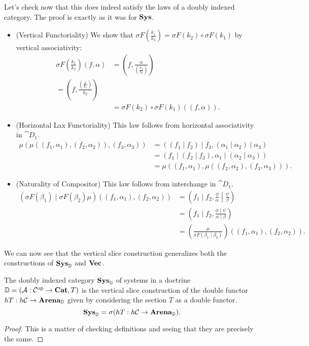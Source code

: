 \documentclass[DynamicalBook]{subfiles}
\begin{document}
Let's check now that this does indeed satisfy the laws of a doubly indexed
category. The proof is exactly as it was for $\textbf{Sys}$. 
\begin{itemize}
  \item (Vertical Functoriality) We show that $\sigma F\left(
      \frac{k_1}{k_2} \right) =
    \sigma F(k_2) \circ \sigma F (k_1)$ by
    vertical associativity:
\begin{align*}
  \sigma F\left(\frac{k_1}{k_2}\right)(f, \alpha) &= \left(f,  \frac{\alpha}{\left( \frac{k_1}{k_2} \right)} \right) \\
= \left(f, \frac{\left( \frac{\alpha}{k_1} \right)}{k_2}   \right)\\
&= \sigma F(k_2) \circ \sigma F (k_1)((f, \alpha)).
\end{align*}

\item (Horizontal Lax Functoriality) This law follows from horizontal
  associativity in $\cat{D}_1$.
\begin{align*}
  \mu(\mu((f_1, \alpha_1), (f_2, \alpha_2)), (f_3, \alpha_3)) &= ((f_1 \mid f_2) \mid f_3, (\alpha_1 \mid \alpha_2) \mid \alpha_3) \\
&= (f_1 \mid (f_2 \mid f_3), \alpha_1 \mid (\alpha_2 \mid \alpha_3)) \\
&= \mu((f_1, \alpha_1), \mu((f_2, \alpha_2), (f_3, \alpha_3))).
\end{align*}
\item (Naturality of Compositor) This law follows from interchange in
  $\cat{D}_1$.
\begin{align*}
  \left( \sigma F(\beta_1) \mid \sigma F(\beta_2){\mu} \right)((f_1, \alpha_1), (f_2, \alpha_2)) &= \left(f_1 \mid f_2,   \left. \frac{\phi}{\alpha} \middle| \frac{\psi}{\beta} \right.\right) \\
&= \left(f_1 \mid f_2,  \frac{\phi \mid \psi}{\alpha \mid \beta}\right) \\
&= \left(  \frac{\mu}{\sigma F(\beta_1 \mid \beta_2)}\right)((f_1,\alpha_1),(f_2,\alpha_2)).
\end{align*}
\end{itemize}

We can now see that the vertical slice construction generalizes both the
constructions of $\textbf{Sys}_{\mathbb{D}}$ and $\textbf{Vec}$. 
\begin{proposition}
  The doubly indexed category $\textbf{Sys}_{\mathbb{D}}$ of systems in a doctrine
  $\mathbb{D} = (\mathcal{A} : \mathcal{C}^{\textnormal{op}} \to \textbf{Cat}, T)$ is the vertical slice
  construction of the double functor $hT : h\mathcal{C} \to
  \textbf{Arena}_{\mathbb{D}}$ given by considering the section $T$ as a double
  functor.
$$\textbf{Sys}_{\mathbb{D}} = \sigma (hT : h\mathcal{C} \to \textbf{Arena}_{\mathbb{D}}).$$
\end{proposition}
\begin{proof}
This is a matter of checking definitions and seeing that they are precisely the same.
\end{proof}
\end{document}
